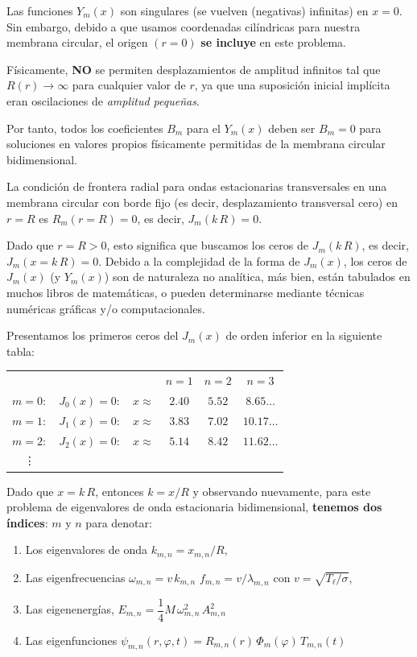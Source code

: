Las funciones $Y_{m} (x)$ son singulares (se vuelven (negativas) infinitas) en $x = 0$. Sin embargo, debido a que usamos coordenadas cilíndricas para nuestra membrana circular, el origen $(r = 0)$ \textbf{se incluye} en este problema.
\par
Físicamente, \textbf{NO} se permiten desplazamientos de amplitud infinitos tal que $R(r) \to \infty$ para cualquier valor de $r$, ya que una suposición inicial implícita eran oscilaciones de \emph{amplitud pequeñas}. 
\par
Por tanto, todos los coeficientes $B_{m}$ para el $Y_{m} (x)$ deben ser $B_{m} = 0$ para soluciones en valores propios físicamente permitidas de la membrana circular bidimensional.
\par
La condición de frontera radial para ondas estacionarias transversales en una membrana circular con borde fijo (es decir, desplazamiento transversal cero) en $r = R$ es $R_{m} (r = R) = 0$,  es decir, $J_{m} (k \, R) = 0$.
\par
Dado que $r = R > 0$, esto significa que buscamos los ceros de $J_{m} (k \, R)$, es decir, $J_{m} (x = k \,R) = 0$. Debido a la complejidad de la forma de $J_{m} (x)$, los ceros de $J_{m} (x)$ (y $Y_{m} (x)$) son de naturaleza no analítica, más bien, están tabulados en muchos libros de matemáticas, o pueden determinarse mediante técnicas numéricas gráficas y/o computacionales.
\par
Presentamos los primeros ceros del $J_{m} (x)$ de orden inferior en la siguiente tabla:
\begin{table}[H]
\centering
\begin{tabular}{c c c c c c}
    & & & $n=1$ & $n=2$ & $n=3$ \\
$m=0:$ & $J_{0}(x)=0:$ & $x \approx$ & $2.40$ & $5.52$ & $8.65  \ldots$ \\
$m=1:$ & $J_{1}(x)=0:$ & $x \approx$ & $3.83$ & $7.02$ & $10.17 \ldots$ \\
$m=2:$ & $J_{2}(x)=0:$ & $x \approx$ & $5.14$ & $8.42$ & $11.62 \ldots$ \\
\vdots
\end{tabular}
\end{table}

Dado que $x = k \, R$, entonces $k = x / R$ y observando nuevamente, para este problema de eigenvalores de onda estacionaria bidimensional, \textbf{tenemos dos índices}: $m$ y $n$ para denotar:
\begin{enumerate}[label=\alph*)]
\item Los eigenvalores de onda $k_{m, n}= x_{m, n} / R$,
\item Las eigenfrecuencias $\omega_{m, n}  = v \, k_{m, n}$  $f_{m, n} = v / \lambda_{m, n}$ con $v = \sqrt{T_{\ell} / \sigma}$,
\item Las eigenenergías, $E_{m, n} = \dfrac{1}{4} M \, \omega_{m, n}^{2} \, A_{m, n}^{2}$
\item Las eigenfunciones $\psi_{m, n} (r, \varphi, t) = R_{m,n} (r) \, \Phi_{m} (\varphi) \, T_{m, n} (t)$
\end{enumerate}

